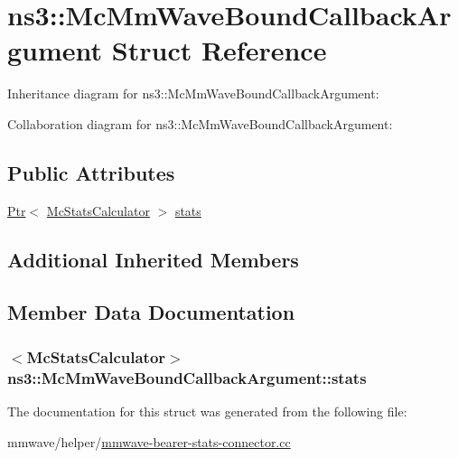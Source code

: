\hypertarget{structns3_1_1McMmWaveBoundCallbackArgument}{}\section{ns3\+:\+:Mc\+Mm\+Wave\+Bound\+Callback\+Argument Struct Reference}
\label{structns3_1_1McMmWaveBoundCallbackArgument}


Inheritance diagram for ns3\+:\+:Mc\+Mm\+Wave\+Bound\+Callback\+Argument\+:


Collaboration diagram for ns3\+:\+:Mc\+Mm\+Wave\+Bound\+Callback\+Argument\+:
\subsection*{Public Attributes}
\begin{DoxyCompactItemize}
\item 
\hyperlink{classns3_1_1Ptr}{Ptr}$<$ \hyperlink{classns3_1_1McStatsCalculator}{Mc\+Stats\+Calculator} $>$ \hyperlink{structns3_1_1McMmWaveBoundCallbackArgument_a4ef8a53a57da94fdc1caee8f1198db52}{stats}
\end{DoxyCompactItemize}
\subsection*{Additional Inherited Members}


\subsection{Member Data Documentation}
\subsubsection[{\texorpdfstring{stats}{stats}}]{$<${\bf Mc\+Stats\+Calculator}$>$ ns3\+::\+Mc\+Mm\+Wave\+Bound\+Callback\+Argument\+::stats}\hypertarget{structns3_1_1McMmWaveBoundCallbackArgument_a4ef8a53a57da94fdc1caee8f1198db52}{}\label{structns3_1_1McMmWaveBoundCallbackArgument_a4ef8a53a57da94fdc1caee8f1198db52}


The documentation for this struct was generated from the following file\+:\begin{DoxyCompactItemize}
\item 
mmwave/helper/\hyperlink{mmwave-bearer-stats-connector_8cc}{mmwave-\/bearer-\/stats-\/connector.\+cc}\end{DoxyCompactItemize}
